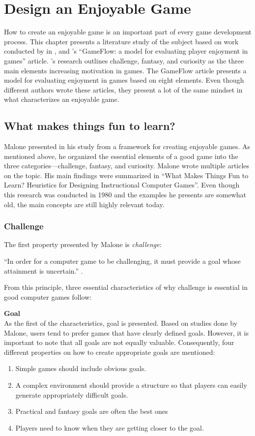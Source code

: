 \documentclass[../Main.tex]{subfiles}
\begin{document}
\section{Design an Enjoyable Game}
\label{chap:8}
How to create an enjoyable game is an important part of every game development process. This chapter presents a literature study of the subject based on work conducted by \citeauthor{malone_what_1980} in \citeyear{malone_what_1980}, and \citeauthor{sweetser_gameflow_2005}’s “GameFlow: a model for evaluating player enjoyment in games” article. \citeauthor{malone_what_1980}’s research outlines challenge, fantasy, and curiosity as the three main elements increasing motivation in games. The GameFlow article presents a model for evaluating enjoyment in games based on eight elements. Even though different authors wrote these articles, they present a lot of the same mindset in what characterizes an enjoyable game.

\subsection{What makes things fun to learn?}
Malone presented in his study from \citeyear{malone_what_1980} a framework for creating enjoyable games. As mentioned above, he organized the essential elements of a good game into the three categories—challenge, fantasy, and curiosity. Malone wrote multiple articles on the topic. His main findings were summarized in “What Makes Things Fun to Learn? Heuristics for Designing Instructional Computer Games”. Even though this research was conducted in 1980 and the examples he presents are somewhat old, the main concepts are still highly relevant today.

\subsubsection{Challenge}
The first property presented by Malone is \textit{challenge}:

“In order for a computer game to be challenging, it must provide a goal whose attainment is uncertain.” \citep{malone_what_1980}. 

From this principle, three essential characteristics of why challenge is essential in good computer games follow:

\textbf{Goal} \\
As the first of the characteristics, goal is presented. Based on studies done by Malone, users tend to prefer games that have clearly defined goals. However, it is important to note that all goals are not equally valuable. Consequently, four different properties on how to create appropriate goals are mentioned:
\begin{enumerate}
    \item Simple games should include obvious goals.
    \item A complex environment should provide a structure so that players can easily generate appropriately difficult goals.
    \item Practical and fantasy goals are often the best ones
    \item Players need to know when they are getting closer to the goal.
\end{enumerate}
\end{document}
